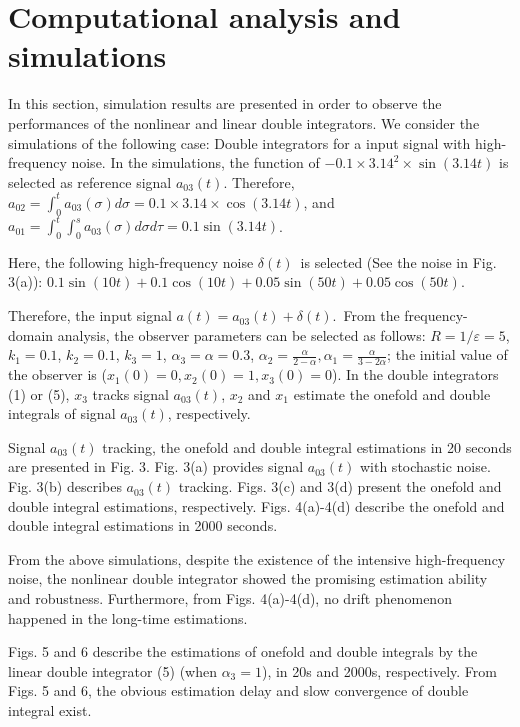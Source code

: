\documentclass[10pt,journal]{IEEEtran}
\begin{document}
\section{Computational analysis and simulations}

In this section, simulation results are presented in order to observe the
performances of the nonlinear and linear double integrators. We consider the
simulations of the following case: Double integrators for a input signal
with high-frequency noise. In the simulations, the function of $-0.1\times
3.14^{2}\times \sin (3.14t)$ is selected as reference signal $a_{03}(t)$.
Therefore, $a_{02}=\int_{0}^{t}a_{03}(\sigma )d\sigma =0.1\times 3.14\times
\cos (3.14t)$, and $a_{01}=\int_{0}^{t}\int_{0}^{s}a_{03}\left( \sigma
\right) d\sigma d\tau =0.1\sin (3.14t)$.

Here, the following high-frequency noise $\delta (t)$\ is selected (See the
noise in Fig. 3(a)): $0.1\sin (10t)+0.1\cos (10t)+0.05\sin (50t)+0.05\cos
(50t)$.

Therefore, the input signal $a(t)=a_{03}(t)+\delta (t)$.\ From the
frequency-domain analysis, the observer parameters can be selected as
follows: $R=1/\varepsilon =5$, $k_{1}=0.1$, $k_{2}=0.1$, $k_{3}=1$, $\alpha
_{3}=\alpha =0.3$, $\alpha _{2}=\frac{\alpha }{2-\alpha },\alpha _{1}=\frac{\alpha }{3-2\alpha }$; the initial value of the observer is ($x_{1}\left(
0\right) =0,x_{2}\left( 0\right) =1,x_{3}\left( 0\right) =0$). In the double
integrators (1) or (5), $x_{3}$ tracks signal $a_{03}(t)$, $x_{2}$ and $x_{1} $ estimate the onefold and double integrals of signal $a_{03}(t)$,
respectively.

Signal $a_{03}(t)$ tracking, the onefold and double integral estimations in
20 seconds are presented in Fig. 3. Fig. 3(a) provides signal $a_{03}\left(
t\right) $ with stochastic noise. Fig. 3(b) describes $a_{03}(t)$ tracking.
Figs. 3(c) and 3(d) present the onefold and double integral estimations,
respectively. Figs. 4(a)-4(d) describe the onefold and double integral
estimations in 2000 seconds.

From the above simulations, despite the existence of the intensive
high-frequency noise, the nonlinear double integrator showed the promising
estimation ability and robustness. Furthermore, from Figs. 4(a)-4(d), no
drift phenomenon happened in the long-time estimations.

Figs. 5 and 6 describe the estimations of onefold and double integrals by
the linear double integrator (5) (when $\alpha _{3}=1$), in 20s and 2000s,
respectively. From Figs. 5 and 6, the obvious estimation delay and slow
convergence of double integral exist.
\end{document}
